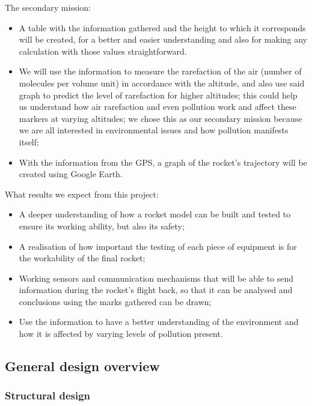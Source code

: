 The secondary mission:

\begin{itemize}
  \item A table with the information gathered and the height to which it corresponds will be created, for a better and easier understanding and also for making any calculation with those values straightforward.
  \item We will use the information to measure the rarefaction of the air (number of molecules per volume unit) in accordance with the altitude, and also use said graph to predict the level of rarefaction for higher altitudes; this could help us understand how air rarefaction and even pollution work and affect these markers at varying altitudes; we chose this as our secondary mission because we are all interested in environmental issues and how pollution manifests itself;
  \item With the information from the GPS, a graph of the rocket’s trajectory will be created using Google Earth.
\end{itemize}

What results we expect from this project:

\begin{itemize}
  \item A deeper understanding of how a rocket model can be built and tested to ensure its working ability, but also its safety;
  \item A realisation of how important the testing of each piece of equipment is for the workability of the final rocket;
  \item Working sensors and communication mechanisms that will be able to send information during the rocket’s flight back, so that it can be analysed and conclusions using the marks gathered can be drawn;
  \item Use the information to have a better understanding of the environment and how it is affected by varying levels of pollution present.
\end{itemize}

\subsection{General design overview}

\subsubsection{Structural design}

